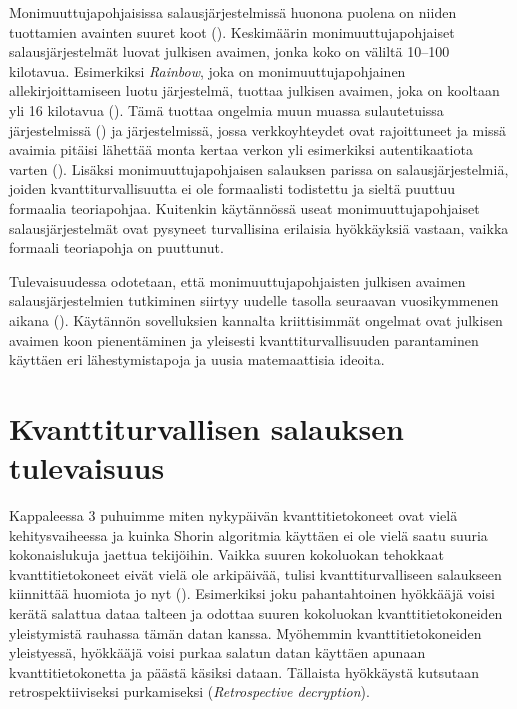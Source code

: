 Monimuuttujapohjaisissa salausjärjestelmissä huonona puolena on niiden tuottamien avainten suuret koot (\cite{8012305}). Keskimäärin monimuuttujapohjaiset salausjärjestelmät luovat julkisen avaimen, jonka koko on väliltä 10--100 kilotavua. Esimerkiksi \emph{Rainbow}, joka on monimuuttujapohjainen allekirjoittamiseen luotu järjestelmä, tuottaa julkisen avaimen, joka on kooltaan yli 16 kilotavua (\cite{Ding2009}). Tämä tuottaa ongelmia muun muassa sulautetuissa järjestelmissä (\cite{8012305}) ja järjestelmissä, jossa verkkoyhteydet ovat rajoittuneet ja missä avaimia pitäisi lähettää monta kertaa verkon yli esimerkiksi autentikaatiota varten (\cite{Ding2009}). Lisäksi monimuuttujapohjaisen salauksen parissa on salausjärjestelmiä, joiden kvanttiturvallisuutta ei ole formaalisti todistettu ja sieltä puuttuu formaalia teoriapohjaa. Kuitenkin käytännössä useat monimuuttujapohjaiset salausjärjestelmät ovat pysyneet turvallisina erilaisia hyökkäyksiä vastaan, vaikka formaali teoriapohja on puuttunut.

Tulevaisuudessa odotetaan, että monimuuttujapohjaisten julkisen avaimen salausjärjestelmien tutkiminen siirtyy uudelle tasolla seuraavan vuosikymmenen aikana (\cite{Ding2009}). Käytännön sovelluksien kannalta kriittisimmät ongelmat ovat julkisen avaimen koon pienentäminen ja yleisesti kvanttiturvallisuuden parantaminen käyttäen eri lähestymistapoja ja uusia matemaattisia ideoita.

\section{Kvanttiturvallisen salauksen tulevaisuus}
Kappaleessa 3 puhuimme miten nykypäivän kvanttitietokoneet ovat vielä kehitysvaiheessa ja kuinka Shorin algoritmia käyttäen ei ole vielä saatu suuria kokonaislukuja jaettua tekijöihin. Vaikka suuren kokoluokan tehokkaat kvanttitietokoneet eivät vielä ole arkipäivää, tulisi kvanttiturvalliseen salaukseen kiinnittää huomiota jo nyt (\cite{ad93d053a85c4acebdd49cbe1a75d6bd}). Esimerkiksi joku pahantahtoinen hyökkääjä voisi kerätä salattua dataa talteen ja odottaa suuren kokoluokan kvanttitietokoneiden yleistymistä rauhassa tämän datan kanssa. Myöhemmin kvanttitietokoneiden yleistyessä, hyökkääjä voisi purkaa salatun datan käyttäen apunaan kvanttitietokonetta ja päästä käsiksi dataan. Tällaista hyökkäystä kutsutaan retrospektiiviseksi purkamiseksi (\emph{Retrospective decryption}).